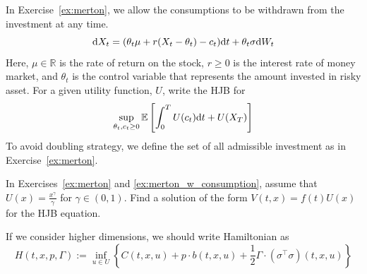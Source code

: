 \documentclass[11pt]{book}
\newcommand{\dd}{\text{\normalfont d}}
\newcommand{\dt}{\text{\normalfont d}t}
\newcommand{\dW}{\text{\normalfont d}W}
\begin{document}
\begin{ex}\label{ex:merton_w_consumption}
    In Exercise~\ref{ex:merton}, we allow the consumptions to be withdrawn from the investment at any time.
    \[
    \dd X_t = (\theta_t \mu + r(X_t-\theta_t)-c_t)\dt + \theta_t \sigma \dW_t
    \]
    Here, $\mu\in\mathbb{R}$ is the rate of return on the stock, $r\ge0$ is the interest rate of money market,  and $\theta_t$ is the control variable that represents the amount invested in risky asset. 
    For a given utility function, $U$, write the HJB for 
    \[
    \sup_{\theta_t,c_t\ge0}\mathbb{E}\left[\int_0^TU(c_t)\dt + U(X_T)\right]
    \]
    To avoid doubling strategy, we define the set of all admissible investment as in Exercise~\ref{ex:merton}.
\end{ex}
\begin{ex}\label{ex:merton_w_consumption_solution}
    In Exercises~\ref{ex:merton} and \ref{ex:merton_w_consumption}, assume that $U(x)=\frac{x^\gamma}{\gamma}$ for $\gamma\in(0,1)$. Find a solution of the form $V(t,x)=f(t)U(x)$ for the HJB equation.
\end{ex}

If we consider higher dimensions, we should write Hamiltonian as  
\begin{equation}
H(t,x,p,\Gamma):=\inf_{u\in U}\left\{ C(t,x,u)  + p\cdot b(t,x,u)+\frac12 \Gamma\cdot(\sigma^{\top}\sigma)(t,x,u)\right\}
\end{equation}
\end{document}
